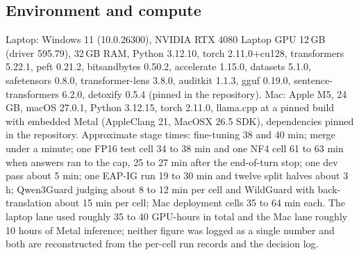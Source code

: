 \subsection{Environment and compute}
Laptop: Windows 11 (10.0.26300), NVIDIA RTX 4080 Laptop GPU 12\,GB (driver 595.79), 32\,GB RAM, Python 3.12.10, torch 2.11.0+cu128, transformers 5.22.1, peft 0.21.2, bitsandbytes 0.50.2, accelerate 1.15.0, datasets 5.1.0, safetensors 0.8.0, transformer-lens 3.8.0, auditkit 1.1.3, gguf 0.19.0, sentence-transformers 6.2.0, detoxify 0.5.4 (pinned in the repository). Mac: Apple M5, 24\,GB, macOS 27.0.1, Python 3.12.15, torch 2.11.0, llama.cpp at a pinned build with embedded Metal (AppleClang 21, MacOSX 26.5 SDK), dependencies pinned in the repository. Approximate stage times: fine-tuning 38 and 40 min; merge under a minute; one FP16 test cell 34 to 38 min and one NF4 cell 61 to 63 min when answers ran to the cap, 25 to 27 min after the end-of-turn stop; one dev pass about 5 min; one EAP-IG run 19 to 30 min and twelve split halves about 3 h; Qwen3Guard judging about 8 to 12 min per cell and WildGuard with back-translation about 15 min per cell; Mac deployment cells 35 to 64 min each. The laptop lane used roughly 35 to 40 GPU-hours in total and the Mac lane roughly 10 hours of Metal inference; neither figure was logged as a single number and both are reconstructed from the per-cell run records and the decision log.
